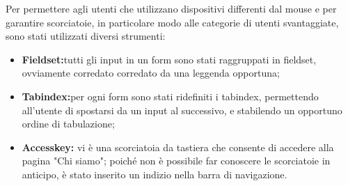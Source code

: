 Per permettere agli utenti che utilizzano dispositivi differenti dal mouse e per garantire scorciatoie, in particolare modo alle categorie di utenti svantaggiate, sono stati utilizzati diversi strumenti:
\begin{itemize}
	\item \textbf{Fieldset:}tutti gli input in un form sono stati raggruppati in fieldset, ovviamente corredato corredato da una leggenda opportuna;
	\item \textbf{Tabindex:}per ogni form sono stati ridefiniti i tabindex, permettendo all'utente di spostarsi da un input al successivo, e stabilendo un opportuno ordine di tabulazione;
	\item \textbf{Accesskey: }vi è una scorciatoia da tastiera che consente di accedere alla pagina "Chi siamo"; poiché non è possibile far conoscere le scorciatoie in anticipo, è stato inserito un indizio nella barra di navigazione.
\end{itemize}